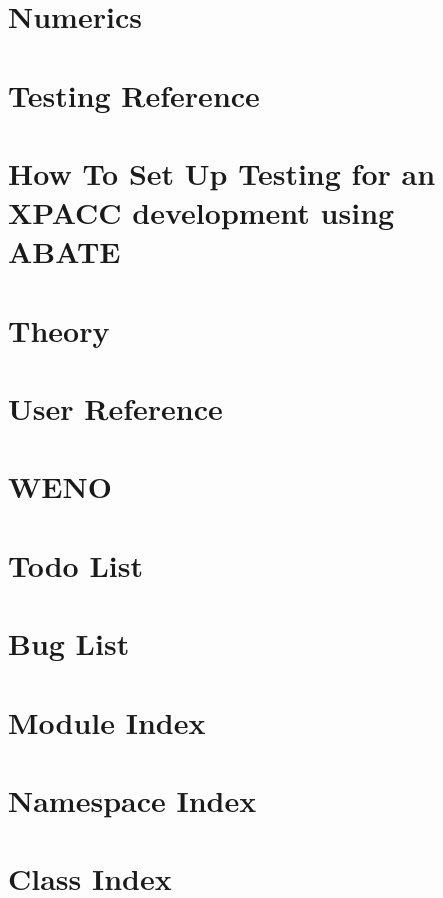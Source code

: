 \documentclass[twoside]{book}
\newcommand{\+}{\discretionary{\mbox{\scriptsize$\hookleftarrow$}}{}{}}
\begin{document}
\chapter{Numerics}
\label{numerics}
\hypertarget{numerics}{}

\chapter{Testing Reference}
\label{testing_reference}
\hypertarget{testing_reference}{}

\chapter{How To Set Up Testing for an X\+P\+A\+CC development using A\+B\+A\+TE}
\label{testingproject_guide}
\hypertarget{testingproject_guide}{}

\chapter{Theory}
\label{theory}
\hypertarget{theory}{}

\chapter{User Reference}
\label{user_reference}
\hypertarget{user_reference}{}

\chapter{W\+E\+NO}
\label{weno}
\hypertarget{weno}{}

\chapter{Todo List}
\label{todo}
\hypertarget{todo}{}

\chapter{Bug List}
\label{bug}
\hypertarget{bug}{}

\chapter{Module Index}

\chapter{Namespace Index}

\chapter{Class Index}

\end{document}
